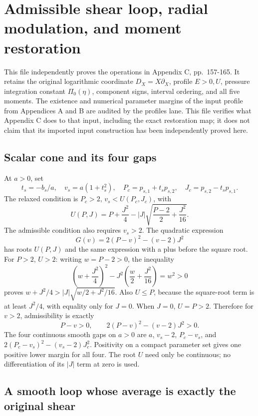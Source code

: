 \documentclass[10pt,a4paper]{article}
\begin{document}
\section{Admissible shear loop, radial modulation, and moment restoration}\label{admissible-shear-loop-radial-modulation-and-moment-restoration}

This file independently proves the operations in Appendix C, pp.~157-165. It retains the original logarithmic coordinate \(D_X=X\partial_X\), profile \(E>0,U\), pressure integration constant \(\Pi_0(\eta)\), component signs, interval ordering, and all five moments. The existence and numerical parameter margins of the input profile from Appendices A and B are audited by the profiles lane. This file verifies what Appendix C does to that input, including the exact restoration map; it does not claim that its imported input construction has been independently proved here.

\subsection{Scalar cone and its four gaps}\label{scalar-cone-and-its-four-gaps}

At \(a>0\), set \[
t_s=-b_s/a,\quad v_s=a(1+t_s^2),\quad
P_c=p_{s,1}+t_sp_{s,2},\quad
J_c=p_{s,2}-t_sp_{s,1}.
\] The relaxed condition is \(P_c>2\), \(v_s<U(P_c,J_c)\), with \[
U(P,J)=P+\frac{J^2}{4}
-|J|\sqrt{\frac{P-2}{2}+\frac{J^2}{16}}.
\] The admissible condition also requires \(v_s>2\). The quadratic expression \[
G(v)=2(P-v)^2-(v-2)J^2
\] has roots \(U(P,J)\) and the same expression with a plus before the square root. For \(P>2\), \(U>2\): writing \(w=P-2>0\), the inequality \[
\left(w+\frac{J^2}{4}\right)^2
-J^2\left(\frac w2+\frac{J^2}{16}\right)=w^2>0
\] proves \(w+J^2/4>|J|\sqrt{w/2+J^2/16}\). Also \(U\le P\), because the square-root term is at least \(J^2/4\), with equality only for \(J=0\). When \(J=0\), \(U=P>2\). Therefore for \(v>2\), admissibility is exactly \[
P-v>0,\qquad 2(P-v)^2-(v-2)J^2>0.
\] The four continuous smooth gaps on \(a>0\) are \(a\), \(v_s-2\), \(P_c-v_s\), and \(2(P_c-v_s)^2-(v_s-2)J_c^2\). Positivity on a compact parameter set gives one positive lower margin for all four. The root \(U\) need only be continuous; no differentiation of its \(|J|\) term at zero is used.

\subsection{A smooth loop whose average is exactly the original shear}\label{a-smooth-loop-whose-average-is-exactly-the-original-shear}
\end{document}
